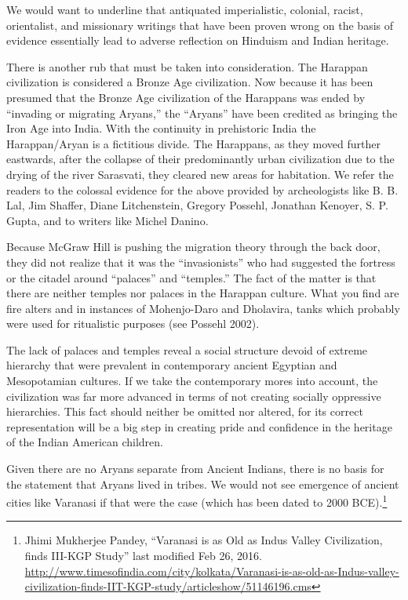 We would want to underline that antiquated imperialistic, colonial, racist, orientalist, and missionary writings that have been proven wrong on the basis of evidence essentially lead to adverse reflection on Hinduism and Indian heritage. 

There is another rub that must be taken into consideration. The Harappan civilization is considered a Bronze Age civilization. Now because it has been presumed that the Bronze Age civilization of the Harappans was ended by “invading or migrating Aryans,” the “Aryans” have been credited as bringing the Iron Age into India. With the continuity in prehistoric India the Harappan/Aryan is a fictitious divide. The Harappans, as they moved further eastwards, after the collapse of their predominantly urban civilization due to the drying of the river Sarasvati, they cleared new areas for habitation. We refer the readers to the colossal evidence for the above provided by archeologists like B. B. Lal, Jim Shaffer, Diane Litchenstein, Gregory Possehl, Jonathan Kenoyer, S. P. Gupta, and to writers like Michel Danino. 
\eject

Because McGraw Hill is pushing the migration theory through the back door, they did not realize that it was the “invasionists” who had suggested the fortress or the citadel around “palaces” and “temples.” The fact of the matter is that there are neither temples nor palaces in the Harappan culture. What you find are fire alters and in instances of Mohenjo-Daro and Dholavira, tanks which probably were used for ritualistic purposes (see Possehl 2002). 

The lack of palaces and temples reveal a social structure devoid of extreme hierarchy that were prevalent in contemporary ancient Egyptian and Mesopotamian cultures. If we take the contemporary mores into account, the civilization was far more advanced in terms of not creating socially oppressive hierarchies. This fact should neither be omitted nor altered, for its correct representation will be a big step in creating pride and confidence in the heritage of the Indian American children. 

Given there are no Aryans separate from Ancient Indians, there is no basis for the statement that Aryans lived in tribes. We would not see emergence of ancient cities like Varanasi if that were the case (which has been dated to 2000 BCE).\footnote{Jhimi Mukherjee Pandey, “Varanasi is as Old as Indus Valley 	Civilization, finds III-KGP Study” last modified Feb 26, 2016. 	\url{http://www.timesofindia.com/city/kolkata/Varanasi-is-as-old-as-Indus-valley-civilization-finds-IIT-KGP-study/articleshow/51146196.cms}} 


